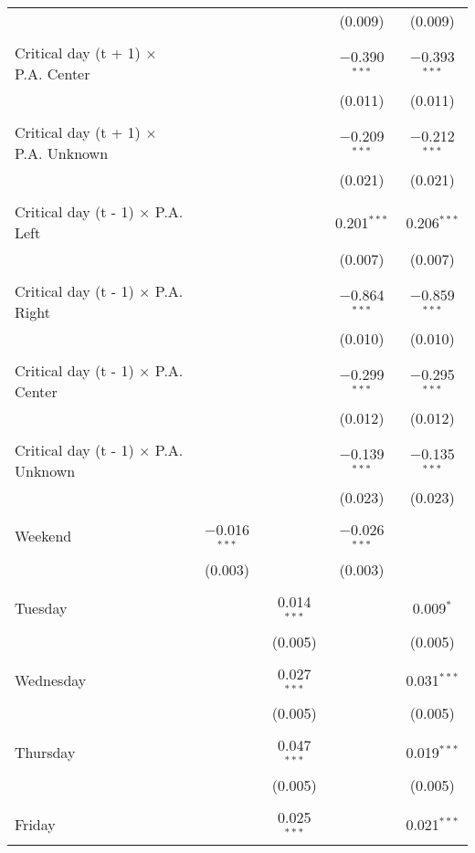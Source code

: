 \documentclass[
]{article}
\begin{document}
\begin{table}[!htbp]
{\begin{tabular}{@{\extracolsep{5pt}}lcccc}
  &  &  & (0.009) & (0.009) \\ 
  & & & & \\ 
 Critical day (t + 1) $\times$ P.A. Center &  &  & $-$0.390$^{***}$ & $-$0.393$^{***}$ \\ 
  &  &  & (0.011) & (0.011) \\ 
  & & & & \\ 
 Critical day (t + 1) $\times$ P.A. Unknown &  &  & $-$0.209$^{***}$ & $-$0.212$^{***}$ \\ 
  &  &  & (0.021) & (0.021) \\ 
  & & & & \\ 
 Critical day (t - 1) $\times$ P.A. Left &  &  & 0.201$^{***}$ & 0.206$^{***}$ \\ 
  &  &  & (0.007) & (0.007) \\ 
  & & & & \\ 
 Critical day (t - 1) $\times$ P.A. Right &  &  & $-$0.864$^{***}$ & $-$0.859$^{***}$ \\ 
  &  &  & (0.010) & (0.010) \\ 
  & & & & \\ 
 Critical day (t - 1) $\times$ P.A. Center &  &  & $-$0.299$^{***}$ & $-$0.295$^{***}$ \\ 
  &  &  & (0.012) & (0.012) \\ 
  & & & & \\ 
 Critical day (t - 1) $\times$ P.A. Unknown &  &  & $-$0.139$^{***}$ & $-$0.135$^{***}$ \\ 
  &  &  & (0.023) & (0.023) \\ 
  & & & & \\ 
 Weekend & $-$0.016$^{***}$ &  & $-$0.026$^{***}$ &  \\ 
  & (0.003) &  & (0.003) &  \\ 
  & & & & \\ 
 Tuesday &  & 0.014$^{***}$ &  & 0.009$^{*}$ \\ 
  &  & (0.005) &  & (0.005) \\ 
  & & & & \\ 
 Wednesday &  & 0.027$^{***}$ &  & 0.031$^{***}$ \\ 
  &  & (0.005) &  & (0.005) \\ 
  & & & & \\ 
 Thursday &  & 0.047$^{***}$ &  & 0.019$^{***}$ \\ 
  &  & (0.005) &  & (0.005) \\ 
  & & & & \\ 
 Friday &  & 0.025$^{***}$ &  & 0.021$^{***}$ \\ 

\end{tabular}}
\end{table}
\end{document}
